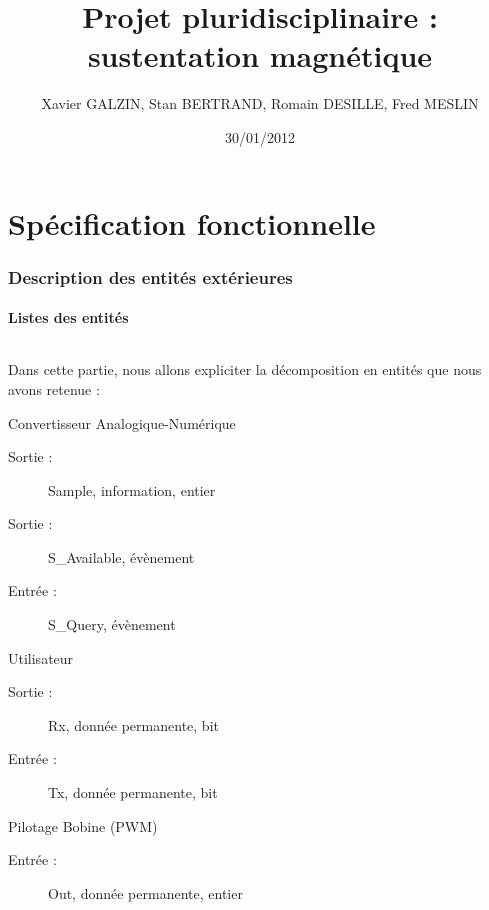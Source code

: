 \documentclass[11pt, french]{article} %
\title{Projet pluridisciplinaire : sustentation magnétique}
\author{ Xavier GALZIN, Stan BERTRAND, Romain DESILLE, Fred MESLIN}
\date{30/01/2012}
\begin{document}
\maketitle
\pagebreak


\part{Spécification fonctionnelle}

\section{Description des entités extérieures}

\subsection{Listes des entités}

\paragraph{} Dans cette partie, nous allons expliciter la décomposition en entités que nous avons retenue :

\vspace{0.2in}
\hspace{0.2in}
Convertisseur Analogique-Numérique
\begin{description}
\item[Sortie :] Sample, information, entier
\item[Sortie :] S\_Available, évènement
\item[Entrée :] S\_Query, évènement
\end{description}

\vspace{0.2in}
\hspace{0.2in}
Utilisateur
\begin{description}
\item[Sortie : ] Rx, donnée permanente, bit
\item[Entrée : ] Tx, donnée permanente, bit
\end{description}

\vspace{0.2in}
\hspace{0.2in}
Pilotage Bobine (PWM)
\begin{description}
\item[Entrée : ] Out, donnée permanente, entier
\end{description}
\end{document}
